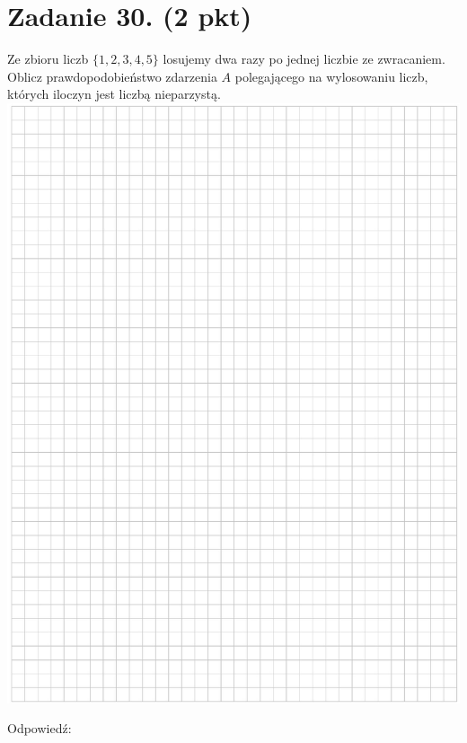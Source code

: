 \documentclass[10pt]{article}
\begin{document}
\section*{Zadanie 30. (2 pkt)}
Ze zbioru liczb \(\{1,2,3,4,5\}\) losujemy dwa razy po jednej liczbie ze zwracaniem. Oblicz prawdopodobieństwo zdarzenia \(A\) polegającego na wylosowaniu liczb, których iloczyn jest liczbą nieparzystą.\\
\includegraphics[max width=\textwidth, center]{2024_11_21_d51d653f4fe4a5bb0c33g-18}

Odpowiedź: \(\qquad\)
\end{document}

